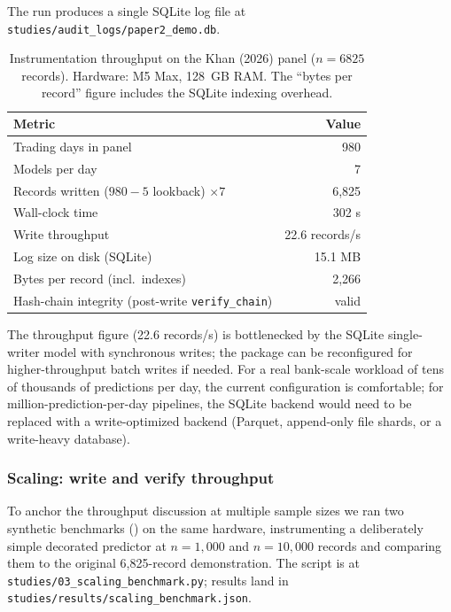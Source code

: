 The run produces a single SQLite log file at \texttt{studies/audit\_logs/paper2\_demo.db}.

\begin{table}[H]
\centering
\caption{Instrumentation throughput on the Khan (2026) panel ($n=6825$ records). Hardware: M5 Max, 128~GB RAM. The ``bytes per record'' figure includes the SQLite indexing overhead.}\label{tab:instrumentation}
\footnotesize
\begin{tabular}{lr}
\toprule
Metric & Value \\
\midrule
Trading days in panel & 980 \\
Models per day & 7 \\
Records written ($980 - 5$ lookback) $\times 7$ & 6{,}825 \\
Wall-clock time & 302 s \\
Write throughput & 22.6 records/s \\
Log size on disk (SQLite) & 15.1 MB \\
Bytes per record (incl.\ indexes) & 2{,}266 \\
Hash-chain integrity (post-write \texttt{verify\_chain}) & valid \\
\bottomrule
\end{tabular}
\end{table}

The throughput figure (22.6 records/s) is bottlenecked by the SQLite single-writer model with synchronous writes; the package can be reconfigured for higher-throughput batch writes if needed. For a real bank-scale workload of tens of thousands of predictions per day, the current configuration is comfortable; for million-prediction-per-day pipelines, the SQLite backend would need to be replaced with a write-optimized backend (Parquet, append-only file shards, or a write-heavy database).

\subsubsection{Scaling: write and verify throughput}\label{sec:scaling}

To anchor the throughput discussion at multiple sample sizes we ran two synthetic benchmarks () on the same hardware, instrumenting a deliberately simple decorated predictor at $n = 1{,}000$ and $n = 10{,}000$ records and comparing them to the original 6{,}825-record demonstration. The script is at \texttt{studies/03\_scaling\_benchmark.py}; results land in \texttt{studies/results/scaling\_benchmark.json}.

